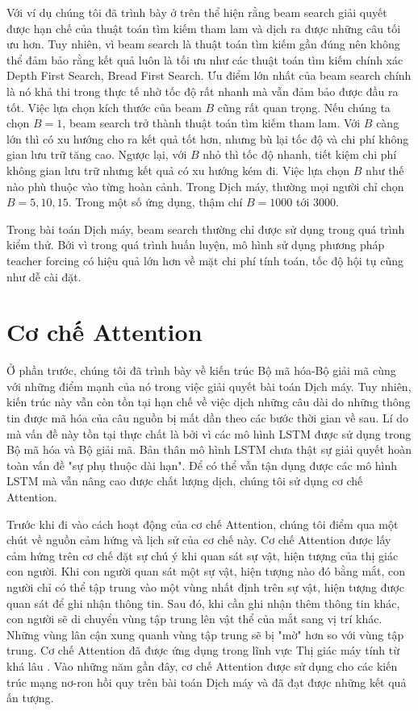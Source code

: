 Với ví dụ chúng tôi đã trình bày ở trên thể hiện rằng beam search giải quyết được hạn chế của thuật toán tìm kiếm tham lam và dịch ra được những câu tối ưu hơn. Tuy nhiên, vì beam search là thuật toán tìm kiếm gần đúng nên không thể đảm bảo rằng kết quả luôn là tối ưu như các thuật toán tìm kiếm chính xác Depth First Search, Bread First Search. Ưu điểm lớn nhất của beam search chính là nó khả thi trong thực tế nhờ tốc độ rất nhanh mà vẫn đảm bảo được đầu ra tốt. Việc lựa chọn kích thước của beam $B$ cũng rất quan trọng. Nếu chúng ta chọn $B = 1$, beam search trở thành thuật toán tìm kiếm tham lam. Với $B$ càng lớn thì có xu hướng cho ra kết quả tốt hơn, nhưng bù lại tốc độ và chi phí không gian lưu trữ tăng cao. Ngược lại, với $B$ nhỏ thì tốc độ nhanh, tiết kiệm chi phí không gian lưu trữ nhưng kết quả có xu hướng kém đi. Việc lựa chọn $B$ như thế nào phù thuộc vào từng hoàn cảnh. Trong Dịch máy, thường mọi người chỉ chọn $B = 5, 10, 15$. Trong một số ứng dụng, thậm chí $B = 1000$ tới $3000$.

Trong bài toán Dịch máy, beam search thường chỉ được sử dụng trong quá trình kiểm thử. Bởi vì trong quá trình huấn luyện, mô hình sử dụng phương pháp teacher forcing có hiệu quả lớn hơn về mặt chi phí tính toán, tốc độ hội tụ cũng như dễ cài đặt.
\section{Cơ chế Attention}
Ở phần trước, chúng tôi đã trình bày về kiến trúc Bộ mã hóa-Bộ giải mã cùng với những điểm mạnh của nó trong việc giải quyết bài toán Dịch máy. Tuy nhiên, kiến trúc này vẫn còn tồn tại hạn chế về việc dịch những câu dài do những thông tin được mã hóa của câu nguồn bị mất dần theo các bước thời gian về sau. Lí do mà vấn đề này tồn tại thực chất là bởi vì các mô hình LSTM được sử dụng trong Bộ mã hóa và Bộ giải mã. Bản thân mô hình LSTM chưa thật sự giải quyết hoàn toàn vấn đề "sự phụ thuộc dài hạn". Để có thể vẫn tận dụng được các mô hình LSTM mà vẫn nâng cao được chất lượng dịch, chúng tôi sử dụng cơ chế Attention.

Trước khi đi vào cách hoạt động của cơ chế Attention, chúng tôi điểm qua một chút về nguồn cảm hứng và lịch sử của cơ chế này. Cơ chế Attention được lấy cảm hứng trên cơ chế đặt sự chú ý khi quan sát sự vật, hiện tượng của thị giác con người. Khi con người quan sát một sự vật, hiện tượng nào đó bằng mắt, con người chỉ có thể tập trung vào một vùng nhất định trên sự vật, hiện tượng được quan sát để ghi nhận thông tin. Sau đó, khi cần ghi nhận thêm thông tin khác, con người sẽ di chuyển vùng tập trung lên vật thể của mắt sang vị trí khác. Những vùng lân cận xung quanh vùng tập trung sẽ bị "mờ" hơn so với vùng tập trung. Cơ chế Attention đã được ứng dụng trong lĩnh vực Thị giác máy tính từ khá lâu \cite{attentionhistory2010} \cite{attentionhistory2011}. Vào những năm gần đây, cơ chế Attention được sử dụng cho các kiến trúc mạng nơ-ron hồi quy trên bài toán Dịch máy và đã đạt được những kết quả ấn tượng.

